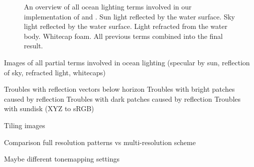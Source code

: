 \begin{figure}
{	\label{fig:results:whitecaps}
 }
 \hfill
\caption{An overview of all ocean lighting terms involved in our implementation
of \citet{article:oceanlighting,misc:oceanlightingfft} and \citet{article:whitecaps}.
 Sun light reflected by the water surface.
 Sky light reflected by the water surface.
 Light refracted from the water body.
 Whitecap foam.
 All previous terms combined into the final
result.
}
\label{fig:results}
\end{figure}
%
Images of all partial terms involved in ocean lighting (specular by sun,
reflection of sky, refracted light, whitecaps)

Troubles with reflection vectors below horizon
Troubles with bright patches caused by reflection
Troubles with dark patches caused by reflection
Troubles with sundisk (XYZ to sRGB)

Tiling images

Comparison full resolution patterns vs multi-resolution scheme

Maybe different tonemapping settings
